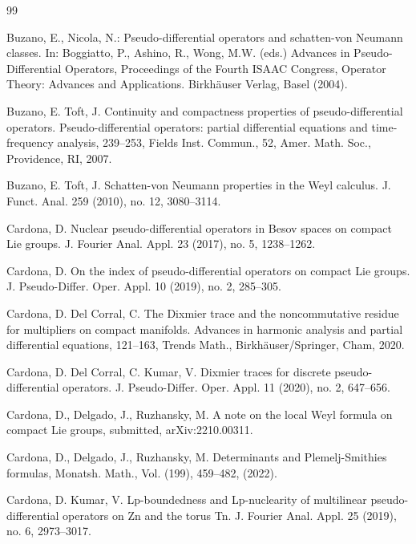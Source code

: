 \documentclass[12pt, reqno]{amsart}
\theoremstyle{definition}
\theoremstyle{remark}
\numberwithin{equation}{section}
\begin{document}

\begin{thebibliography}{99}


 Buzano, E., Nicola, N.: Pseudo-differential operators and schatten-von Neumann classes. In: Boggiatto, P., Ashino, R., Wong, M.W. (eds.) Advances in Pseudo-Differential Operators, Proceedings of the Fourth ISAAC Congress, Operator Theory: Advances and Applications. Birkh\"auser Verlag, Basel (2004).

 Buzano, E. Toft, J. Continuity and compactness properties of pseudo-differential operators. Pseudo-differential operators: partial differential equations and time-frequency analysis, 239--253, Fields Inst. Commun., 52, Amer. Math. Soc., Providence, RI, 2007.

  Buzano, E. Toft, J. Schatten-von Neumann properties in the Weyl calculus. J. Funct. Anal. 259 (2010), no. 12, 3080--3114. 


 Cardona, D. Nuclear pseudo-differential operators in Besov spaces on compact Lie groups. J. Fourier Anal. Appl. 23 (2017), no. 5, 1238--1262. 

 Cardona, D. On the index of pseudo-differential operators on compact Lie groups. J. Pseudo-Differ. Oper. Appl. 10 (2019), no. 2, 285--305.



  Cardona, D. Del Corral, C. The Dixmier trace and the noncommutative residue for multipliers on compact manifolds. Advances in harmonic analysis and partial differential equations, 121--163, Trends Math., Birkh\"auser/Springer, Cham, 2020.

 Cardona, D. Del Corral, C. Kumar, V. Dixmier traces for discrete pseudo-differential operators. J. Pseudo-Differ. Oper. Appl. 11 (2020), no. 2, 647--656.



  Cardona, D., Delgado, J., Ruzhansky, M. A note on the local Weyl formula on compact Lie groups, submitted, arXiv:2210.00311.

 Cardona, D., Delgado, J., Ruzhansky, M. Determinants and Plemelj-Smithies formulas, Monatsh. Math., Vol. (199), 459–482, (2022).

 Cardona, D. Kumar, V. Lp-boundedness and Lp-nuclearity of multilinear pseudo-differential operators on Zn and the torus Tn. J. Fourier Anal. Appl. 25 (2019), no. 6, 2973--3017. 




\end{thebibliography}
\end{document}
